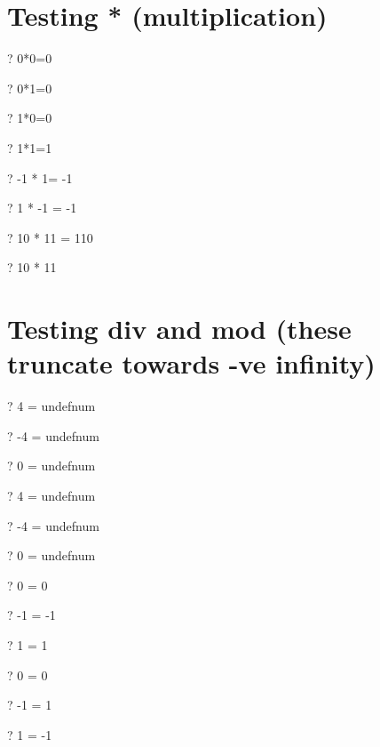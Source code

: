 \documentclass{article}
\newcommand{\negate}{-}
\begin{document}
\section{Testing * (multiplication)}
\begin{zed} \vdash?   0*0=0 \end{zed}
\begin{zed} \vdash?   0*1=0 \end{zed}
\begin{zed} \vdash?   1*0=0 \end{zed}
\begin{zed} \vdash?   1*1=1 \end{zed}
\begin{zed} \vdash?   \negate 1 * 1= \negate 1 \end{zed}
\begin{zed} \vdash?   1 * \negate 1 = \negate 1 \end{zed}
\begin{zed} \vdash?   10 * 11 = 110 \end{zed}
\begin{zed} \vdash?   10 * 11  \end{zed}


\section{Testing div and mod   (these truncate towards -ve infinity)}

\begin{zed} \vdash?  4  = undefnum \end{zed}
\begin{zed} \vdash?   \negate 4  = undefnum \end{zed}
\begin{zed} \vdash?   0  = undefnum \end{zed}

\begin{zed} \vdash?   4  = undefnum \end{zed}
\begin{zed} \vdash?   \negate 4  = undefnum \end{zed}
\begin{zed} \vdash?   0  = undefnum \end{zed}

\begin{zed} \vdash?   0  = 0 \end{zed}
\begin{zed} \vdash?   \negate 1  = \negate 1 \end{zed}
\begin{zed} \vdash?   1  = 1 \end{zed}
\begin{zed} \vdash?   0 \div \negate 1 = 0 \end{zed}
\begin{zed} \vdash?   \negate 1 \div \negate 1 = 1 \end{zed}
\begin{zed} \vdash?   1 \div \negate 1 = \negate 1 \end{zed}
\end{document}
